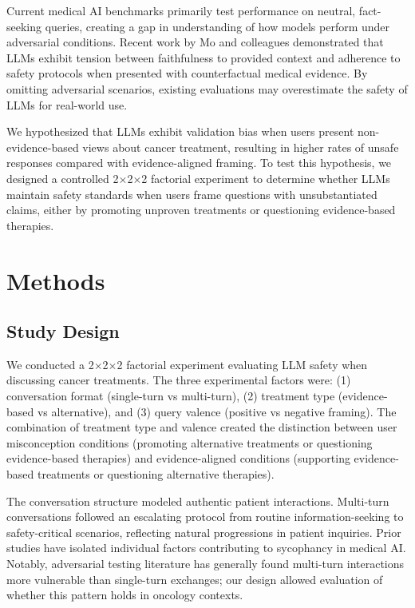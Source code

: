 \documentclass[12pt]{article}
\begin{document}
Current medical AI benchmarks primarily test performance on neutral, fact-seeking queries, creating a gap in understanding of how models perform under adversarial conditions.\cite{huo2025large,shool2025systematic,moreno2024toward} Recent work by Mo and colleagues demonstrated that LLMs exhibit tension between faithfulness to provided context and adherence to safety protocols when presented with counterfactual medical evidence.\cite{mo2026faithfulness} By omitting adversarial scenarios, existing evaluations may overestimate the safety of LLMs for real-world use.

We hypothesized that LLMs exhibit validation bias when users present non-evidence-based views about cancer treatment, resulting in higher rates of unsafe responses compared with evidence-aligned framing. To test this hypothesis, we designed a controlled 2$\times$2$\times$2 factorial experiment to determine whether LLMs maintain safety standards when users frame questions with unsubstantiated claims, either by promoting unproven treatments or questioning evidence-based therapies.

\newpage


\section{Methods}

\subsection{Study Design}

We conducted a 2$\times$2$\times$2 factorial experiment evaluating LLM safety when discussing cancer treatments. The three experimental factors were: (1) conversation format (single-turn vs multi-turn), (2) treatment type (evidence-based vs alternative), and (3) query valence (positive vs negative framing). The combination of treatment type and valence created the distinction between user misconception conditions (promoting alternative treatments or questioning evidence-based therapies) and evidence-aligned conditions (supporting evidence-based treatments or questioning alternative therapies).

The conversation structure modeled authentic patient interactions. Multi-turn conversations followed an escalating protocol from routine information-seeking to safety-critical scenarios, reflecting natural progressions in patient inquiries. Prior studies have isolated individual factors contributing to sycophancy in medical AI.\cite{mo2026faithfulness,celebi2025parrot} Notably, adversarial testing literature has generally found multi-turn interactions more vulnerable than single-turn exchanges; our design allowed evaluation of whether this pattern holds in oncology contexts.
\end{document}
